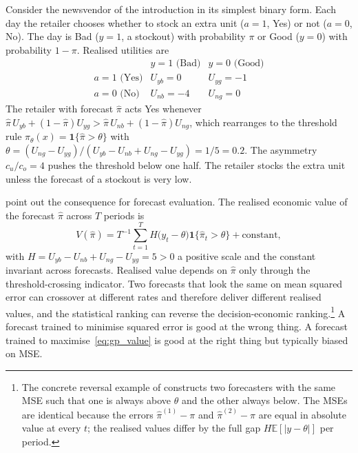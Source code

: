 Consider the newsvendor of the introduction in its simplest binary form.
Each day the retailer chooses whether to stock an extra unit ($a = 1$,
Yes) or not ($a = 0$, No). The day is Bad ($y = 1$, a stockout) with
probability $\pi$ or Good ($y = 0$) with probability $1 - \pi$. Realised
utilities are
\begin{equation}
\begin{array}{c|cc}
                  & y = 1 \text{ (Bad)} & y = 0 \text{ (Good)} \\ \hline
a = 1 \text{ (Yes)} & U_{yb} = 0           & U_{yg} = -1 \\
a = 0 \text{ (No)}  & U_{nb} = -4          & U_{ng} = 0
\end{array}
\label{eq:gp_payoff_table}
\end{equation}
The retailer with forecast $\hat\pi$ acts Yes whenever
$\hat\pi\, U_{yb} + (1 - \hat\pi) U_{yg} > \hat\pi\, U_{nb} +
(1 - \hat\pi) U_{ng}$, which rearranges to the threshold rule
$\pi_\theta(x) = \mathbf 1\{\hat\pi > \theta\}$ with
$\theta = (U_{ng} - U_{yg}) / (U_{yb} - U_{nb} + U_{ng} - U_{yg})
= 1/5 = 0.2$. The asymmetry $c_u / c_o = 4$ pushes the threshold below
one half. The retailer stocks the extra unit unless the forecast of a
stockout is very low.

\citet{GrangerPesaran2000} point out the consequence for forecast
evaluation. The realised economic value of the forecast $\hat\pi$ across
$T$ periods is
\begin{equation}
V(\hat\pi)
= T^{-1} \sum_{t=1}^T H \bigl(y_t - \theta\bigr)
  \mathbf 1\{\hat\pi_t > \theta\}
  + \text{constant},
\label{eq:gp_value}
\end{equation}
with $H = U_{yb} - U_{nb} + U_{ng} - U_{yg} = 5 > 0$ a positive scale and
the constant invariant across forecasts. Realised value depends on
$\hat\pi$ only through the threshold-crossing indicator. Two forecasts that
look the same on mean squared error can crossover at different rates and
therefore deliver different realised values, and the statistical ranking
can reverse the decision-economic ranking.\footnote{The concrete reversal
example of \citet{GrangerPesaran2000} constructs two forecasters with the
same MSE such that one is always above $\theta$ and the other always
below. The MSEs are identical because the errors $\hat\pi^{(1)} - \pi$ and
$\hat\pi^{(2)} - \pi$ are equal in absolute value at every $t$; the
realised values differ by the full gap $H \mathbb E[|y - \theta|]$ per
period.} A forecast trained to minimise squared error is good at the wrong
thing. A forecast trained to maximise~\eqref{eq:gp_value} is good at the
right thing but typically biased on MSE.

